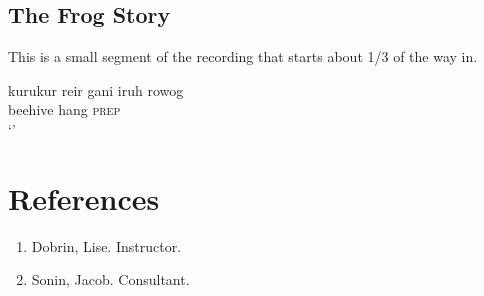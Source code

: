 \documentclass[pdftex,12pt,letterpaper]{article}
\begin{document}
 \subsection{The Frog Story}

 This is a small segment of the recording that starts about 1/3 of the way in.

 \begin{exe}
 \ex 
 \gll kurukur reir gani iruh rowog\\
 beehive hang \textsc{prep} \\
 \trans `'
 \end{exe}


 \pagebreak
 \section*{References}

 \begin{enumerate}

 \item Dobrin, Lise. Instructor.

 \item Sonin, Jacob. Consultant.


 \end{enumerate}




 
\end{document}
